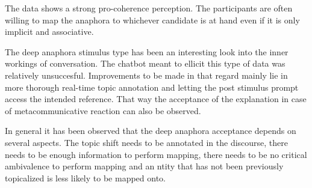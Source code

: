 The data shows a strong pro-coherence perception.
The participants are often willing to map the anaphora to whichever candidate is at hand
even if it is only implicit and associative.

The deep anaphora stimulus type has been an interesting look into the inner workings of conversation.
The chatbot meant to ellicit this type of data was relatively unsuccesful.
Improvements to be made in that regard mainly lie in more thorough real-time topic annotation
and letting the post stimulus prompt access the intended reference.
That way the acceptance of the explanation in case of metacommunicative reaction can also be observed.

In general it has been observed that the deep anaphora acceptance depends on several aspects.
The topic shift needs to be annotated in the discourse,
there needs to be enough information to perform mapping,
there needs to be no critical ambivalence to perform mapping and
an ntity that has not been previously topicalized is less likely to be mapped onto.
